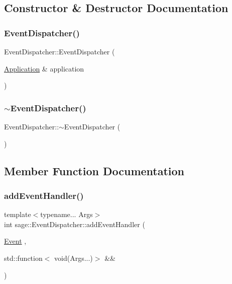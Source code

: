 \subsection{Constructor \& Destructor Documentation}
\mbox{\label{classsage_1_1EventDispatcher_aa80c440a5ba6379d084f616417ce0958}} 
\subsubsection{\texorpdfstring{EventDispatcher()}{EventDispatcher()}}
{\footnotesize\ttfamily Event\+Dispatcher\+::\+Event\+Dispatcher (\begin{DoxyParamCaption}\item[{\mbox{\hyperlink{classsage_1_1Application}{Application}} \&}]{application }\end{DoxyParamCaption})}

\mbox{\label{classsage_1_1EventDispatcher_abb5f401014e87f03027d6c4450964e55}} 
\subsubsection{\texorpdfstring{$\sim$EventDispatcher()}{~EventDispatcher()}}
{\footnotesize\ttfamily Event\+Dispatcher\+::$\sim$\+Event\+Dispatcher (\begin{DoxyParamCaption}{ }\end{DoxyParamCaption})}



\subsection{Member Function Documentation}
\mbox{\label{classsage_1_1EventDispatcher_a871869f2a078e81c20a220a633d4e471}} 
\subsubsection{\texorpdfstring{addEventHandler()}{addEventHandler()}\hspace{0.1cm}{\footnotesize\ttfamily [1/2]}}
{\footnotesize\ttfamily template$<$typename... Args$>$ \\
int sage\+::\+Event\+Dispatcher\+::add\+Event\+Handler (\begin{DoxyParamCaption}\item[{\mbox{\hyperlink{namespacesage_afe706a25026cc74fe69b56d53a265d29}{Event}}}]{,  }\item[{std\+::function$<$ void(Args...)$>$ \&\&}]{ }\end{DoxyParamCaption})}

